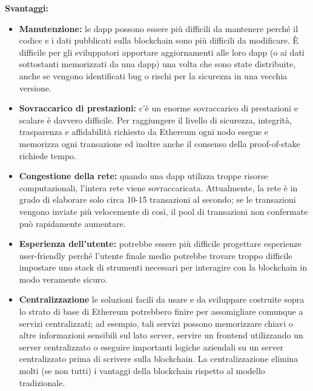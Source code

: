 \textbf{Svantaggi:}
\begin{itemize}
    \item \textbf{Manutenzione:} le dapp possono essere più difficili da
        mantenere perché il codice e i dati pubblicati sulla blockchain sono
        più difficili da modificare. È difficile per gli sviluppatori apportare
        aggiornamenti alle loro dapp (o ai dati sottostanti memorizzati da una
        dapp) una volta che sono state distribuite, anche se vengono
        identificati bug o rischi per la sicurezza in una vecchia versione.
    \item \textbf{Sovraccarico di prestazioni:} c'è un enorme sovraccarico di
        prestazioni e scalare è davvero difficile. Per raggiungere il livello
        di sicurezza, integrità, trasparenza e affidabilità richiesto da
        Ethereum ogni nodo esegue e memorizza ogni transazione ed inoltre anche
        il consenso della proof-of-stake richiede tempo.
    \item \textbf{Congestione della rete:} quando una dapp utilizza troppe
        risorse computazionali, l'intera rete viene sovraccaricata.
        Attualmente, la rete è in grado di elaborare solo circa 10-15
        transazioni al secondo; se le transazioni vengono inviate più
        velocemente di così, il pool di transazioni non confermate può
        rapidamente aumentare.
    \item \textbf{Esperienza dell'utente:} potrebbe essere più difficile
        progettare esperienze user-friendly perché l'utente finale medio
        potrebbe trovare troppo difficile impostare uno stack di strumenti
        necessari per interagire con la blockchain in modo veramente sicuro.
    \item \textbf{Centralizzazione} le soluzioni facili da usare e da
        sviluppare costruite sopra lo strato di base di Ethereum potrebbero
        finire per assomigliare comunque a servizi centralizzati; ad esempio,
        tali servizi possono memorizzare chiavi o altre informazioni sensibili
        sul lato server, servire un frontend utilizzando un server
        centralizzato o eseguire importanti logiche aziendali su un server
        centralizzato prima di scrivere sulla blockchain. La centralizzazione
        elimina molti (se non tutti) i vantaggi della blockchain rispetto al
        modello tradizionale.
\end{itemize}

\newpage

